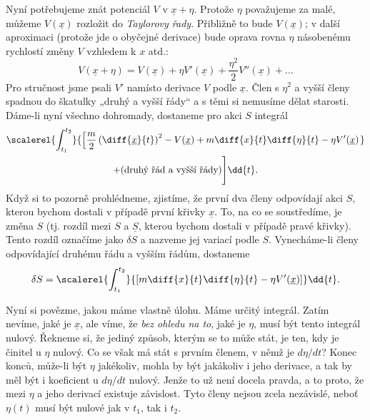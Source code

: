     Nyní potřebujeme znát potenciál \(V\) v \(\underline{x}+\eta\). Protože \(\eta\) považujeme za
    malé, můžeme \(V(\underline{x})\) rozložit do \emph{Taylorovy řady}. Přibližně to bude
    \(V(\underline{x})\); v další aproximaci (protože jde o obyčejné derivace) bude oprava rovna
    \(\eta\) násobenému rychlostí změny \(V\) vzhledem k \(x\) atd.:
    \begin{equation*}
      V(\underline{x}+\eta) = V(\underline{x}) + \eta V'(\underline{x})
      + \dfrac{\eta^2}{2} V''(\underline{x}) + \ldots
    \end{equation*}
    Pro stručnost jsme psali \(V'\) namísto derivace \(V\) podle \(\underline{x}\). Člen s
    \(\eta^2\) a vyšší členy spadnou do škatulky „druhý a vyšší řády“ a s těmi si nemusíme dělat
    starosti. Dáme-li nyní všechno dohromady, dostaneme pro akci \(S\) integrál
    \begin{multline*}
      \scalerel{\int_{t_1}^{t_2}}{
        \left[
            \frac{m}{2}\left(\diff{\underline{x}}{t}\right)^2-V(\underline{x}) 
            + m\diff{x}{t}\diff{\eta}{t} - \eta V'(\underline{x}) 
        \right.}        \\
            + (\text{druhý řád a vyšší řády})
        \Bigg]
      \dd{t}.
    \end{multline*}
    Když si to pozorně prohlédneme, zjistíme, že první dva členy odpovídají akci \(S\), kterou
    bychom dostali v případě první křivky \(\underline{x}\). To, na co se soustředíme, je změna
    \(S\) (tj. rozdíl mezi \(S\) a \(\underline{S}\), kterou bychom dostali v případě pravé křivky).
    Tento rozdíl označíme jako \(\delta S\) a nazveme jej variací podle \(S\). Vynecháme-li členy
    odpovídající druhému řádu a vyšším řádům, dostaneme
    \begin{equation*}
      \delta S  = \scalerel{\int_{t_1}^{t_2}}{
                    \left[m\diff{x}{t}\diff{\eta}{t} - \eta V'(\underline{x})\right]
        }\dd{t}.
    \end{equation*}  
    
    Nyní si povězme, jakou máme vlastně úlohu. Máme určitý integrál. Zatím nevíme, jaké je
    \(\underline{x}\), ale víme, že \emph{bez ohledu na to}, jaké je \(\eta\), musí být tento
    integrál nulový. Řekneme si, že jediný způsob, kterým se to může stát, je ten, kdy je činitel u
    \(\eta\) nulový. Co se však má stát s prvním členem, v němž je \(d\eta/dt\)? Konec konců,
    může-li být \(\eta\) jakékoliv, mohla by být jakákoliv i jeho derivace, a tak by měl být i
    koeficient u \(d\eta/dt\) nulový. Jenže to už není docela pravda, a to proto, že mezi \(\eta\) a
    jeho derivací existuje závislost. Tyto členy nejsou zcela nezávislé, neboť \(\eta(t)\) musí být
    nulové jak v \(t_1\), tak i \(t_2\).

